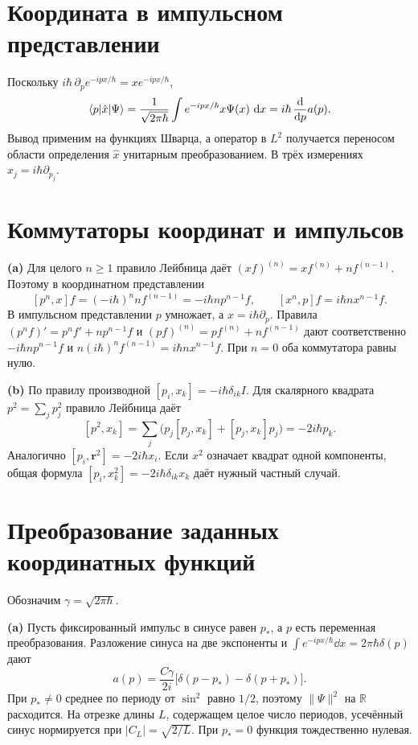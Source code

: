 \documentclass[11pt,a4paper]{article}
\begin{document}
\section{Координата в импульсном представлении}

Поскольку \(i\hbar\,\partial_p e^{-ipx/\hbar}=x e^{-ipx/\hbar}\),
\[
 \langle p\rvert\hat x\lvert \Psi\rangle=
 \frac1{\sqrt{2\pi\hbar}}\int e^{-ipx/\hbar}x\Psi(x)\,\mathop{}\!\mathrm{d} x
 =i\hbar\,\frac{\mathop{}\!\mathrm{d}}{\mathop{}\!\mathrm{d} p}a(p).
\]
Вывод применим на функциях Шварца, а оператор в \(L^2\)
получается переносом области определения \(\hat x\)
унитарным преобразованием. В трёх измерениях
\(\hat x_j=i\hbar\partial_{p_j}\).

\section{Коммутаторы координат и импульсов}

\textbf{(a)} Для целого \(n\ge1\) правило Лейбница даёт
\((xf)^{(n)}=xf^{(n)}+nf^{(n-1)}\). Поэтому в координатном
представлении
\[
 [p^n,x]f=(-i\hbar)^n n f^{(n-1)}=-i\hbar n p^{n-1}f,\qquad
 [x^n,p]f=i\hbar n x^{n-1}f.
\]
В импульсном представлении \(p\) умножает, а \(x=i\hbar\partial_p\).
Правила \((p^n f)'=p^nf'+np^{n-1}f\) и
\((pf)^{(n)}=pf^{(n)}+nf^{(n-1)}\) дают соответственно
\(-i\hbar np^{n-1}f\) и \(n(i\hbar)^n f^{(n-1)}
=i\hbar n x^{n-1}f\). При \(n=0\) оба коммутатора равны нулю.

\textbf{(b)} По правилу производной
\([p_i,x_k]=-i\hbar\delta_{ik}I\).
Для скалярного квадрата \(p^2=\sum_j p_j^2\) правило Лейбница даёт
\[
 [p^2,x_k]=\sum_j\bigl(p_j[p_j,x_k]+[p_j,x_k]p_j\bigr)
 =-2i\hbar p_k .
\]
Аналогично \([p_i,\mathbf r^2]=-2i\hbar x_i\).
Если \(x^2\) означает квадрат одной компоненты, общая формула
\([p_i,x_k^2]=-2i\hbar\delta_{ik}x_k\) даёт нужный частный случай.

\section{Преобразование заданных координатных функций}

Обозначим \(\gamma=\sqrt{2\pi\hbar}\).

\textbf{(a)} Пусть фиксированный импульс в синусе равен \(p_*\),
а \(p\) есть переменная преобразования. Разложение синуса на две
экспоненты и \(\int e^{-ipx/\hbar}\dd x=2\pi\hbar\delta(p)\) дают
\[
 a(p)=\frac{C\gamma}{2i}\bigl[\delta(p-p_*)-\delta(p+p_*)\bigr].
\]
При \(p_*\ne0\) среднее по периоду от \(\sin^2\) равно \(1/2\),
поэтому \(\|\Psi\|^2\) на \(\mathbb R\) расходится. На отрезке
длины \(L\), содержащем целое число периодов, усечённый синус
нормируется при \(|C_L|=\sqrt{2/L}\).
При \(p_*=0\) функция тождественно нулевая.
\end{document}
